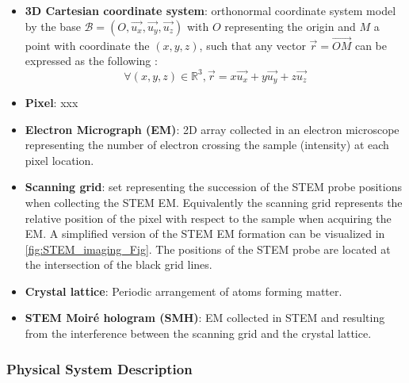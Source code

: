 \documentclass[12pt]{article}
\begin{document}
\begin{itemize}

\item \textbf{3D Cartesian coordinate system}: orthonormal coordinate system 
model by the base $\mathcal{B}=(O,\vec{u_x},\vec{u_y},\vec{u_z} )$ with $O$ representing 
the origin and $M$ a point with coordinate the $(x,y,z)$, such that any vector 
$\vec{r}=\overrightarrow{\mathit{OM}}$ can be expressed as the following :
\begin{equation}
\forall (x,y,z) \in \mathbb{R}^{3}, \vec{r}=x\vec{u_x}+y\vec{u_y}+z\vec{u_z}
\end{equation}
\item \textbf{Pixel}: xxx
\item \textbf{Electron Micrograph (EM)}: 2D array collected in an electron 
microscope representing the number of electron crossing the sample (intensity) 
at each pixel location.
\item \textbf{Scanning grid}: set representing the succession of the STEM probe 
positions when collecting the STEM EM. Equivalently the scanning grid represents 
the relative position of the pixel with respect to the sample when acquiring the 
EM. A simplified version of the 
STEM EM formation can be visualized in \cref{fig:STEM_imaging_Fig}. The 
positions of the STEM probe are located at the intersection of the black grid 
lines.
\item \textbf{Crystal lattice}: Periodic arrangement of atoms forming matter.
\item \textbf{STEM Moir{\'e} hologram (SMH)}: EM collected in STEM and resulting 
from the interference between the scanning grid and the crystal lattice. 
\end{itemize}

\subsubsection{Physical System Description}
\end{document}
